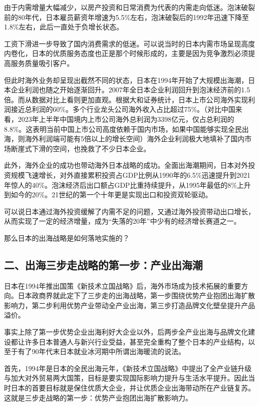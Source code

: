 由于内需增量大幅减少，以房产投资和日常消费为代表的内需走向低迷。泡沫破裂前的80年代，日本雇员薪资年增速为5.5\%左右，泡沫破裂后的1992年迅速下降至1.8\%左右，此后一直处于负增长状态。

工资下滑进一步导致了国内消费需求的低迷。可以说当时的日本内需市场呈现高度内卷化，日本的优质服务态度也正是那个时候形成的，主要是因为竞争激烈必须提高服务质量吸引客户。

但此时海外业务却呈现出截然不同的状态，日本在1994年开始了大规模出海潮，日本企业利润也随之开始逐渐回升。2007年全日本企业利润回升到泡沫经济前的1.5倍。而从数据对比上看则更加直观。根据大和证券统计，日本上市公司海外实现利润接近总利润的60\%。多个行业龙头公司海外收入占比超过75\%。（对比中国来看，2023年上半年中国境内上市公司海外总利润为3398亿元，仅占总利润的8.8\%。这表明当前中国上市公司高度依赖于国内市场，如果中国能够实现全民出海，则海外利润端可能有5倍以上的增长空间）海外企业利润极大地填补了国内市场断崖式下滑的空间，也挽救了不少日本企业。

此外，海外企业的成功也带动海外日本战略的成功。全面出海潮期间，日本对外投资规模飞速增长，对外直接累积投资占GDP比例从1990年的6.5\%迅速提升到2021年惊人的40\%。泡沫经济后出口额占GDP比重持续提升，从1995年最低的8\%上升到如今的20\%。21世纪的第一个十年更是实现出口和投资双轮驱动。

可以说日本通过海外投资缓解了内需不足的问题，又通过海外投资带动出口增长，从而实现了一定的经济增量，成为“失落的20年”中少有的经济增长赛道之一。

那么日本的出海战略是如何落地实施的？

\subsection{二、出海三步走战略的第一步：产业出海潮}

日本在1994年推出国策《新技术立国战略》后，海外市场成为技术拓展的重要方向。日本政商界就此定下了三步走的出海战略，第一步围绕优势产业抱团出海扩散影响力，第二步利用优势产业带动全产业出海，第三步打造品牌文化壁垒提升产品溢价。

事实上除了第一步优势企业出海利好大企业以外，后两步全产业出海与品牌文化建设都让许多日本普通人与新兴行业受益，甚至完全重构了整个日本的产业结构，以至于有了90年代末日本就业冰河期中所谓出海暖流的说法。

首先，1994年是日本的全民出海元年，《新技术立国战略》中提出了全产业链升级与加大对外贸易两大国策，目标是要实现国际影响力提升与生活水平提升。因此当时日本的首要目标就是保住优质大企业，并让优质企业出海带动所在产业链复苏。这就是三步走战略的第一步：优势产业抱团出海扩散影响力。


